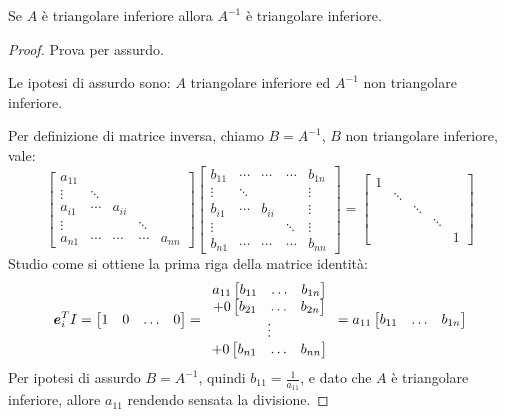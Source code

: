 \begin{exercise}[3.4]
\label{exercise:341}
Se $A$ \`e triangolare inferiore allora $A^{-1}$ \`e triangolare inferiore.
\end{exercise}
\begin{proof}
Prova per assurdo.

Le ipotesi di assurdo sono: $A$ triangolare inferiore ed $A^{-1}$ non
triangolare inferiore. 

Per definizione di matrice inversa, chiamo $B = A^{-1}$, $B$ non triangolare
inferiore, vale:
\begin{displaymath}
\begin{bmatrix}
a_{11} \\
\vdots & \ddots \\
a_{i1} & \cdots & a_{ii} \\
\vdots & 		&		& \ddots\\
a_{n1} & \cdots & \cdots &\cdots & a_{nn}
\end{bmatrix} %
\begin{bmatrix}
b_{11} & \cdots & \cdots &\cdots & b_{1n} \\
\vdots & \ddots &		&		& \vdots\\
b_{i1} & \cdots & b_{ii} &		& \vdots\\
\vdots & 		&		& \ddots & \vdots\\
b_{n1} & \cdots & \cdots &\cdots & b_{nn}
\end{bmatrix} =
\begin{bmatrix}
1 \\
 & \ddots \\
 & 		& \ddots \\
 & 		&		& \ddots\\
 &  	&  		&		& 1
\end{bmatrix}
\end{displaymath}
Studio come si ottiene la prima riga della matrice identit\`a:
\begin{displaymath}
\boldsymbol{e}_{i}^{T} I = 
\begin{bmatrix}
1 & 0 & \ldots & 0
\end{bmatrix} = 
\begin{array}{c}
a_{11}
	\begin{bmatrix}
	b_{11} & \ldots & b_{1n}
	\end{bmatrix} \\
+ 0
	\begin{bmatrix}
	b_{21} & \ldots & b_{2n}
	\end{bmatrix}  \\
\vdots \\
+ 0
	\begin{bmatrix}
	b_{n1} & \ldots & b_{nn}
	\end{bmatrix}
\end{array} =
a_{11}
	\begin{bmatrix}
	b_{11} & \ldots & b_{1n}
	\end{bmatrix} 
\end{displaymath}
Per ipotesi di assurdo $B = A^{-1}$, quindi $b_{11} = \frac{1}{a_{11}}$, e dato
che $A$ \`e triangolare inferiore, allore $a_{11}$ rendendo sensata la
divisione.


\end{proof}
